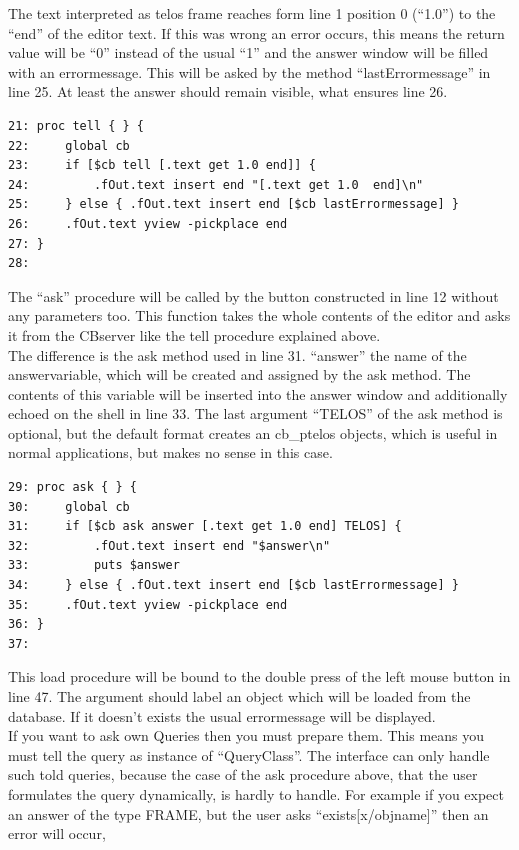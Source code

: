 	The text interpreted as telos frame reaches form line 1 position 0 (``1.0'') 
	 to the ``end'' of the editor text.
	If this was wrong an error occurs, 
	 this means the return value will be ``0'' instead of the usual ``1'' 
	 and the answer window will be filled with an errormessage.
	This will be asked by the method ``lastErrormessage'' in line 25.
	At least the answer should remain visible, what ensures line 26.
\begin{verbatim}
21: proc tell { } {
22:     global cb
23:     if [$cb tell [.text get 1.0 end]] {
24: 	    .fOut.text insert end "[.text get 1.0  end]\n"
25:     } else { .fOut.text insert end [$cb lastErrormessage] }   
26:     .fOut.text yview -pickplace end
27: }
28: 
\end{verbatim}
	The ``ask'' procedure will be called by the button constructed in line 12 without
	 any parameters too. This function takes the whole contents of the editor and asks it
	 from the CBserver like the tell procedure explained above.\\
	The difference is the ask method used in line 31. ``answer'' the name of the
	 answervariable, which will be created and assigned by the ask method.
	The contents of this variable will be inserted into the answer window and 
	 additionally echoed on the shell in line 33.
	The last argument ``TELOS'' of the ask method is optional, 
	 but the default format creates an cb\_ptelos objects, 
	 which is useful in normal applications, 
	 but makes no sense in this case.	
\begin{verbatim}
29: proc ask { } {
30:     global cb
31:     if [$cb ask answer [.text get 1.0 end] TELOS] {
32: 	    .fOut.text insert end "$answer\n"
33: 	    puts $answer
34:     } else { .fOut.text insert end [$cb lastErrormessage] }
35:     .fOut.text yview -pickplace end
36: }
37: 
\end{verbatim}
	This load procedure will be bound to the double press 
	 of the left mouse button in line 47.
	The argument should label an object which will be loaded from the database.
	If it doesn't exists the usual errormessage will be displayed. \\
	If you want to ask own Queries then you must prepare them. 
	This means you must tell the query as instance of ``QueryClass''.
	The interface can only handle such told queries, 
	 because the case of the ask procedure above, 
	 that the user formulates the query dynamically, 
	 is hardly to handle.
	For example if you expect an answer of the type FRAME, 
	 but the user asks ``exists[x/objname]'' then an error will occur, 
